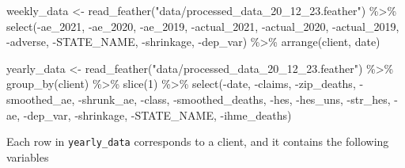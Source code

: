 \documentclass[
]{article}
\newenvironment{Shaded}{\begin{snugshade}}{\end{snugshade}}
\newcommand{\DecValTok}[1]{\textcolor[rgb]{0.00,0.00,0.81}{#1}}
\newcommand{\FunctionTok}[1]{\textcolor[rgb]{0.00,0.00,0.00}{#1}}
\newcommand{\NormalTok}[1]{#1}
\newcommand{\OtherTok}[1]{\textcolor[rgb]{0.56,0.35,0.01}{#1}}
\newcommand{\SpecialCharTok}[1]{\textcolor[rgb]{0.00,0.00,0.00}{#1}}
\newcommand{\StringTok}[1]{\textcolor[rgb]{0.31,0.60,0.02}{#1}}
\begin{document}
\begin{Shaded}
\begin{Highlighting}[]
\NormalTok{weekly\_data }\OtherTok{\textless{}{-}}
  \FunctionTok{read\_feather}\NormalTok{(}\StringTok{"data/processed\_data\_20\_12\_23.feather"}\NormalTok{) }\SpecialCharTok{\%\textgreater{}\%}
  \FunctionTok{select}\NormalTok{(}\SpecialCharTok{{-}}\NormalTok{ae\_2021, }\SpecialCharTok{{-}}\NormalTok{ae\_2020, }\SpecialCharTok{{-}}\NormalTok{ae\_2019,}
         \SpecialCharTok{{-}}\NormalTok{actual\_2021, }\SpecialCharTok{{-}}\NormalTok{actual\_2020, }\SpecialCharTok{{-}}\NormalTok{actual\_2019, }\SpecialCharTok{{-}}\NormalTok{adverse,}
         \SpecialCharTok{{-}}\NormalTok{STATE\_NAME, }\SpecialCharTok{{-}}\NormalTok{shrinkage,  }\SpecialCharTok{{-}}\NormalTok{dep\_var) }\SpecialCharTok{\%\textgreater{}\%}
  \FunctionTok{arrange}\NormalTok{(client, date)}

\NormalTok{yearly\_data }\OtherTok{\textless{}{-}}
  \FunctionTok{read\_feather}\NormalTok{(}\StringTok{"data/processed\_data\_20\_12\_23.feather"}\NormalTok{) }\SpecialCharTok{\%\textgreater{}\%}
  \FunctionTok{group\_by}\NormalTok{(client) }\SpecialCharTok{\%\textgreater{}\%}
  \FunctionTok{slice}\NormalTok{(}\DecValTok{1}\NormalTok{) }\SpecialCharTok{\%\textgreater{}\%}
  \FunctionTok{select}\NormalTok{(}\SpecialCharTok{{-}}\NormalTok{date, }\SpecialCharTok{{-}}\NormalTok{claims, }\SpecialCharTok{{-}}\NormalTok{zip\_deaths, }\SpecialCharTok{{-}}\NormalTok{smoothed\_ae, }\SpecialCharTok{{-}}\NormalTok{shrunk\_ae,}
         \SpecialCharTok{{-}}\NormalTok{class, }\SpecialCharTok{{-}}\NormalTok{smoothed\_deaths,}
         \SpecialCharTok{{-}}\NormalTok{hes, }\SpecialCharTok{{-}}\NormalTok{hes\_uns, }\SpecialCharTok{{-}}\NormalTok{str\_hes, }\SpecialCharTok{{-}}\NormalTok{ae, }\SpecialCharTok{{-}}\NormalTok{dep\_var, }\SpecialCharTok{{-}}\NormalTok{shrinkage, }\SpecialCharTok{{-}}\NormalTok{STATE\_NAME, }\SpecialCharTok{{-}}\NormalTok{ihme\_deaths)}
\end{Highlighting}
\end{Shaded}

Each row in \texttt{yearly\_data} corresponds to a client, and it
contains the following variables
\end{document}
